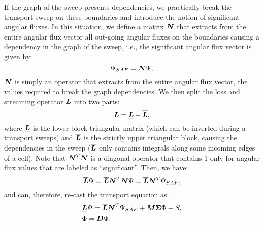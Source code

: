 If the graph of the sweep presents dependencies, we practically break the
transport sweep on these boundaries and introduce the notion of significant
angular fluxes. In this situation, we define a matrix $\boldsymbol{N}$ that extracts
from the entire angular flux vector all out-going angular fluxes on the
boundaries causing a dependency in the graph of the sweep, i.e., the
significant angular flux vector is given by:
\begin{equation}
  \Psi_{SAF} = \boldsymbol{N} \Psi,
\end{equation}
$\boldsymbol{N}$ is simply an operator that extracts from the entire angular flux vector,
the values required to break the graph dependencies. We then split the loss
and streaming operator $\boldsymbol{L}$ into two parts:
\begin{equation}
  \boldsymbol{L} = \underline{\boldsymbol{L}} - \overline{\boldsymbol{L}},
\end{equation}
where $\underline{\boldsymbol{L}}$ is the lower block triangular matrix (which can be
inverted during a transport sweeps) and $\overline{\boldsymbol{L}}$ is the strictly
upper triangular block, causing the dependencies in the sweep
($\overline{\boldsymbol{L}}$ only contains integrals along some incoming edges of a
cell). Note that $\boldsymbol{N}^T\boldsymbol{N}$ is a diagonal operator that contains 1 only
for angular flux values that are labeled as ``significant''. Then, we have:
\begin{equation}
  \overline{\boldsymbol{L}} \Psi = \overline{\boldsymbol{L}} \boldsymbol{N}^T\boldsymbol{N}\Psi =
  \overline{\boldsymbol{L}}\boldsymbol{N}^T \Psi_{SAF},
\end{equation}
and can, therefore, re-cast the transport equation as:
\begin{align}
  &\underline{\boldsymbol{L}}\Psi =\overline{\boldsymbol{L}}\boldsymbol{N}^T \Psi_{SAF} + \boldsymbol{M\Sigma}
  \Phi + S,\\
  &\Phi = \boldsymbol{D}\Psi.
\end{align}
